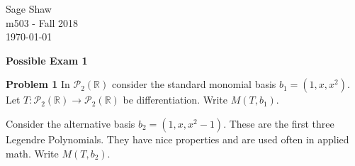 \documentclass[12pt]{article}
\newcommand{\problem}[1]{\hspace{-4 ex} \large \textbf{Problem #1} }
\newcommand{\RR}{\mathbb{R}}
\newcommand{\PP}{\mathcal{P}}
\begin{document}
	\thispagestyle{empty}
	
	\begin{flushright}
		Sage Shaw \\
		m503 - Fall 2018 \\
		\today
	\end{flushright}
	
\begin{center}{\large \textbf{Possible Exam 1}}\end{center}
\bigbreak

\hspace{-.5 ex}\problem{1} In $\PP_2(\RR)$ consider the standard monomial basis $b_1 = (1, x, x^2)$. Let $T: \PP_2(\RR) \to \PP_2(\RR)$ be differentiation. Write $M(T, b_1)$.

\bigbreak
\bigbreak
\bigbreak
\bigbreak
\bigbreak
\bigbreak
\bigbreak
\bigbreak
\bigbreak
\bigbreak
\bigbreak
\bigbreak
\bigbreak
\bigbreak
\bigbreak
\bigbreak
\bigbreak
\bigbreak
\bigbreak
\bigbreak

Consider the alternative basis $b_2 = (1, x, x^2-1)$. These are the first three Legendre Polynomials. They have nice properties and are used often in applied math. Write $M(T, b_2)$.
\end{document}
